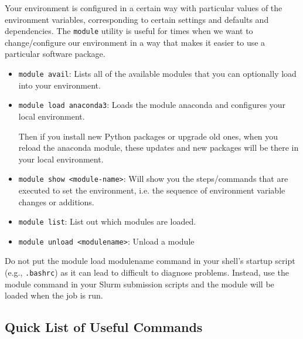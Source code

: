 \documentclass[12pt]{article}
\theoremstyle{plain}
\theoremstyle{definition}
\theoremstyle{remark}
\begin{document}
Your environment is configured in a certain way with particular values
of the environment variables, corresponding to certain settings and
defaults and dependencies.
The \texttt{module} utility is useful for times when we want to
change/configure our environment in a way that makes it easier to use a
particular software package.
\begin{itemize}
  \item \texttt{module avail}:
    Lists all of the available modules that you can optionally load into
    your environment.
  \item \texttt{module load anaconda3}:
      Loads the module anaconda and configures your local environment.

      Then if you install new Python packages or upgrade old ones, when
      you reload the anaconda module, these updates and new packages
      will be there in your local environment.

  \item \texttt{module show <module-name>}:
      Will show you the steps/commands that are executed to set the
      environment, i.e. the sequence of environment variable changes or
      additions.

  \item \texttt{module list}:
    List out which modules are loaded.

  \item \texttt{module unload <modulename>}:
    Unload a module
\end{itemize}
Do not put the module load modulename command in your shell's startup
script (e.g., \texttt{.bashrc}) as it can lead to difficult to diagnose
problems.  Instead, use the module command in your Slurm submission
scripts and the module will be loaded when the job is run.




\clearpage
\subsection{Quick List of Useful Commands}
\end{document}
